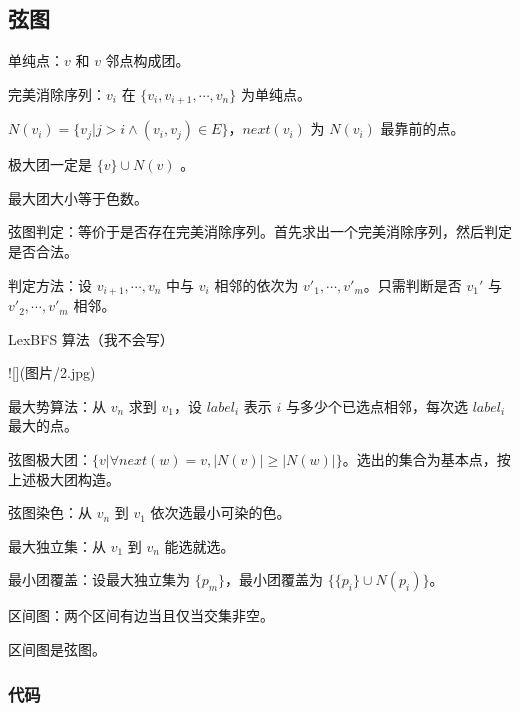 \documentclass{ctexart}
\begin{document}
\subsection{弦图}

单纯点：$v$ 和 $v$ 邻点构成团。

完美消除序列：$v_i$ 在 $\{v_i,v_{i+1},\cdots,v_n\}$ 为单纯点。

$N(v_i)=\{v_j|j>i\land (v_i,v_j)\in E\}$，$next(v_i)$ 为 $N(v_i)$ 最靠前的点。

极大团一定是 $\{v\}\cup N(v)$ 。

最大团大小等于色数。

弦图判定：等价于是否存在完美消除序列。首先求出一个完美消除序列，然后判定是否合法。

判定方法：设 $v_{i+1},\cdots,v_n$ 中与 $v_i$ 相邻的依次为 $v'_1,\cdots,v'_m$。只需判断是否 $v_1'$ 与 $v'_2,\cdots,v'_m$ 相邻。

LexBFS 算法（我不会写）

![](图片/2.jpg)

最大势算法：从 $v_n$ 求到 $v_1$，设 $label_i$ 表示 $i$ 与多少个已选点相邻，每次选 $label_i$ 最大的点。

弦图极大团：$\{v|\forall next(w)=v,|N(v)|\ge |N(w)|\}$。选出的集合为基本点，按上述极大团构造。

弦图染色：从 $v_n$ 到 $v_1$ 依次选最小可染的色。

最大独立集：从 $v_1$ 到 $v_n$ 能选就选。

最小团覆盖：设最大独立集为 $\{p_m\}$，最小团覆盖为 $\{\{p_i\}\cup N(p_i)\}$。

区间图：两个区间有边当且仅当交集非空。

区间图是弦图。

\subsubsection{代码}
\end{document}
